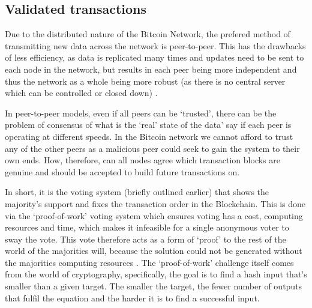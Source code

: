 \documentclass{article}
\begin{document}
    \subsection{Validated transactions}
    
    Due to the distributed nature of the Bitcoin Network, the prefered method of transmitting new data across the network is peer-to-peer. This has the drawbacks of less efficiency, as data is replicated many times and updates need to be sent to each node in the network, but results in each peer being more independent and thus the network as a whole being more robust (as there is no central server which can be controlled or closed down) \citep{22_brave_new_coin_2016}. 

In peer-to-peer models, even if all peers can be `trusted', there can be the problem of consensus of what is the `real' state of the data' say if each peer is operating at different speeds. In the Bitcoin network we cannot afford to trust any of the other peers as a malicious peer could seek to gain the system to their own ends. How, therefore, can all nodes agree which transaction blocks are genuine and should be accepted to build future transactions on.

In short, it is the voting system (briefly outlined earlier) that shows the majority’s support and fixes the transaction order in the Blockchain. This is done via the `proof-of-work' voting system which ensures voting has a cost, computing resources and time, which makes it infeasible for a single anonymous voter to sway the vote. This vote therefore acts as a form of `proof' to the rest of the world of the majorities will, because the solution could not be generated without the majorities computing resources \citep{24_distributed_ledgers_and_blockchain_technology_2016}. The `proof-of-work' challenge itself comes from the world of cryptography, specifically, the goal is to find a hash input that’s smaller than a given target. The smaller the target, the fewer number of outputs that fulfil the equation and the harder it is to find a successful input.
\end{document}
